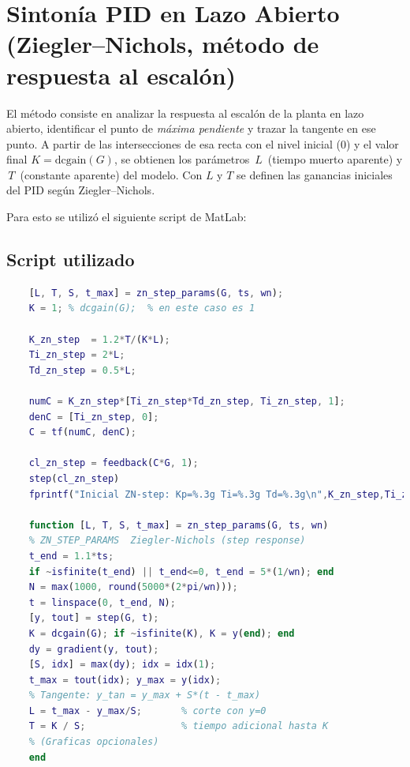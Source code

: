\section{Sintonía PID en Lazo Abierto (Ziegler--Nichols, método de respuesta al escalón)}

El método consiste en analizar la respuesta al escalón de la planta en lazo abierto, identificar el punto de \emph{máxima pendiente} y trazar la tangente en ese punto. A partir de las intersecciones de esa recta con el nivel inicial (0) y el valor final \(K=\mathrm{dcgain}(G)\), se obtienen los parámetros \(\,L\,\) (tiempo muerto aparente) y \(\,T\,\) (constante aparente) del modelo. Con \(L\) y \(T\) se definen las ganancias iniciales del PID según Ziegler--Nichols.

Para esto se utilizó el siguiente script de MatLab:
\onecolumn
\subsection{Script utilizado}
\begin{lstlisting}[language=Matlab,style = matlabstyle, caption={ZN por respuesta al escalon: extraccion de L y T y calculo de PID}, label={lst:zn_step}, frame=single]
	% ======= Step Response Method (ZN) =======
	[L, T, S, t_max] = zn_step_params(G, ts, wn);
	K = 1; % dcgain(G);  % en este caso es 1
	
	K_zn_step  = 1.2*T/(K*L);
	Ti_zn_step = 2*L;
	Td_zn_step = 0.5*L;
	
	numC = K_zn_step*[Ti_zn_step*Td_zn_step, Ti_zn_step, 1];
	denC = [Ti_zn_step, 0];
	C = tf(numC, denC);
	
	cl_zn_step = feedback(C*G, 1);
	step(cl_zn_step)
	fprintf("Inicial ZN-step: Kp=%.3g Ti=%.3g Td=%.3g\n",K_zn_step,Ti_zn_step,Td_zn_step);
	
	function [L, T, S, t_max] = zn_step_params(G, ts, wn)
	% ZN_STEP_PARAMS  Ziegler-Nichols (step response)
	t_end = 1.1*ts;
	if ~isfinite(t_end) || t_end<=0, t_end = 5*(1/wn); end
	N = max(1000, round(5000*(2*pi/wn)));
	t = linspace(0, t_end, N);
	[y, tout] = step(G, t);
	K = dcgain(G); if ~isfinite(K), K = y(end); end
	dy = gradient(y, tout);
	[S, idx] = max(dy); idx = idx(1);
	t_max = tout(idx); y_max = y(idx);
	% Tangente: y_tan = y_max + S*(t - t_max)
	L = t_max - y_max/S;       % corte con y=0
	T = K / S;                 % tiempo adicional hasta K
	% (Graficas opcionales)
	end
\end{lstlisting}

\twocolumn

